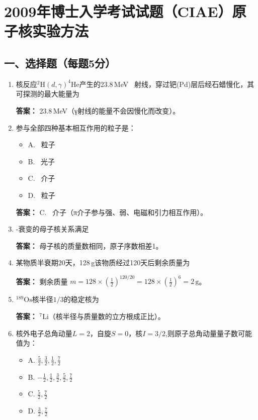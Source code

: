 \documentclass{article}
\begin{document}
\section*{2009年博士入学考试试题（CIAE）原子核实验方法}

\subsection*{一、选择题（每题5分）}

\begin{enumerate}[label=\arabic*.]
    \item 核反应$ ^2\text{H}(d, \gamma)^4\text{He} $产生的23.8\,MeV \textgamma\ 射线，穿过钯(Pd)层后经石蜡慢化，其可探测的最大能量为\underline{\hspace{2cm}}
    
    \textbf{答案：} 23.8\,MeV（γ射线的能量不会因慢化而改变）。
    
    \item 参与全部四种基本相互作用的粒子是：
    \begin{itemize}[label={},leftmargin=2em]
        \item A. \textbeta\ 粒子 
        \item B. \textgamma\ 光子
        \item C. \textpi\ 介子 
        \item D. \textupsilon\ 粒子
    \end{itemize}
    
    \textbf{答案：} C. \textpi\ 介子（π介子参与强、弱、电磁和引力相互作用）。
    
    \item \textbeta-衰变的母子核关系满足\underline{\hspace{2cm}}
    
    \textbf{答案：} 母子核的质量数相同，原子序数相差1。
    
    \item 某物质半衰期20天，128\,g该物质经过120天后剩余质量为\underline{\hspace{2cm}}
    
    \textbf{答案：} 剩余质量 \( m = 128 \times \left(\frac{1}{2}\right)^{120/20} = 128 \times \left(\frac{1}{2}\right)^6 = 2\, \text{g} \)。
    
    \item $^{189}\text{Os}$核半径$1/3$的稳定核为
    
    \textbf{答案：} $^{7}\text{Li}$（核半径与质量数的立方根成正比）。
    
    \item 核外电子总角动量$L=2$，自旋$S=0$，核$I=3/2$,则原子总角动量量子数可能值为：
    \begin{itemize}[label={},leftmargin=2em]
        \item A. $\frac{5}{2}, \frac{3}{2}, \frac{1}{2}, \frac{7}{2}$
        \item B. $-\frac{1}{2}, \frac{1}{2}, \frac{3}{2}, \frac{5}{2}, \frac{7}{2}$
        \item C. $\frac{5}{2}, \frac{7}{2}$ 
        \item D. $\frac{3}{2}, \frac{7}{2}$
    \end{itemize}
    

\end{enumerate}
\end{document}
